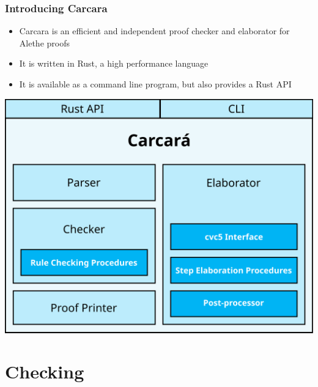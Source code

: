 \documentclass[usepdftitle=false,aspectratio=169]{beamer}
\newcommand\vitem{\vfill\item}
\begin{document}
\begin{frame}
  \frametitle{Introducing Carcara}
  \begin{minipage}[c][0.6 \textheight]{0.55 \textwidth}
    \begin{itemize}
      \item Carcara is an efficient and independent proof checker and
      elaborator for Alethe proofs
      \vitem It is written in Rust, a high performance language
      \vitem It is available as a command line program, but also provides a Rust
      API
    \end{itemize}
  \end{minipage}
  \begin{minipage}{0.44 \textwidth}
    \centering
    \includegraphics[height=0.6\textheight]{images/architecture.png}
  \end{minipage}
\end{frame}

\section{Checking}
\end{document}
